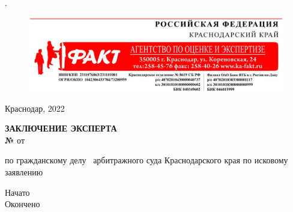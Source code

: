 %
%
%
.\bigskip
\vspace{-25mm}
\noindent\begin{figure}[H]
	\centering
	\includegraphics[width=1\linewidth]{images/fakt/верх_лого}
\end{figure}

\vspace{8mm}

\hfill 	Краснодар, 2022    
\vspace{-1mm}

\begin{center}
	\LARGE\textbf{ ЗАКЛЮЧЕНИЕ ЭКСПЕРТА}
	\bigskip\\[-6mm]
	
		{{\large\textbf{№ \NomerDoc}   от \textbf{\dataend}}
	}
	\bigskip\\[0mm]

\end{center}
\par
\vspace{-3mm}

\par
\vspace{0mm}\noindent по гражданскому делу \delonum \, арбитражного суда Краснодарского края по исковому заявлению \isk \\[3mm]


\noindent\parbox[l][16mm]{7cm}
{\def\hrf#1{\hbox to#1{\hrulefill}}
	\noindent Начато\hfill            \datastart\\%
	Окончено\hfill                \dataend\\%
}
\relax

